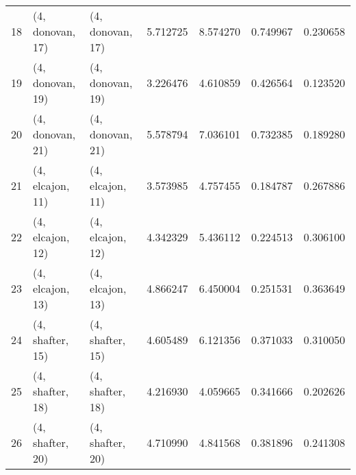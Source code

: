 \begin{tabular}{lllrrrr}
18 &  (4, donovan, 17) &  (4, donovan, 17) &  5.712725 &  8.574270 &   0.749967 &  0.230658 \\
19 &  (4, donovan, 19) &  (4, donovan, 19) &  3.226476 &  4.610859 &   0.426564 &  0.123520 \\
20 &  (4, donovan, 21) &  (4, donovan, 21) &  5.578794 &  7.036101 &   0.732385 &  0.189280 \\
21 &  (4, elcajon, 11) &  (4, elcajon, 11) &  3.573985 &  4.757455 &   0.184787 &  0.267886 \\
22 &  (4, elcajon, 12) &  (4, elcajon, 12) &  4.342329 &  5.436112 &   0.224513 &  0.306100 \\
23 &  (4, elcajon, 13) &  (4, elcajon, 13) &  4.866247 &  6.450004 &   0.251531 &  0.363649 \\
24 &  (4, shafter, 15) &  (4, shafter, 15) &  4.605489 &  6.121356 &   0.371033 &  0.310050 \\
25 &  (4, shafter, 18) &  (4, shafter, 18) &  4.216930 &  4.059665 &   0.341666 &  0.202626 \\
26 &  (4, shafter, 20) &  (4, shafter, 20) &  4.710990 &  4.841568 &   0.381896 &  0.241308 \\
\bottomrule
\end{tabular}
